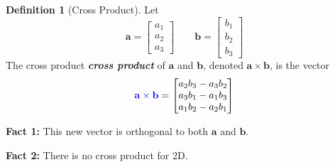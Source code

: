 \documentclass[10pt]{article}
\DeclareRobustCommand{\demph}[1]{%
  \ifmmode
  {\color{Blue}#1}%
  \else
  {\color{Blue}\bfseries\slshape #1}%
  \fi
}
\theoremstyle{definition}
\newtheorem{definition}[theorem]{Definition}
\newcommand{\fl}{\noindent\textbf} %
\newcommand{\1}[1]{\textbf{1}_{\left[#1\right]}} %
\begin{document}
\begin{definition}[Cross Product]
  \label{def:cross-product}
  Let
  \begin{equation*}
    \mathbf{a}=
    \begin{bmatrix}
      a_{1}\\a_{2}\\a_{3}
    \end{bmatrix}
    \qquad
    \mathbf{b}=
    \begin{bmatrix}
      b_{1}\\b_{2}\\b_{3}
    \end{bmatrix}
  \end{equation*}
  The \demph{cross product} of $\mathbf{a}$ and $\mathbf{b}$, denoted $\mathbf{a}\times \mathbf{b}$, is the vector
  \begin{equation*}
    \demph{\mathbf{a} \times \mathbf{b}} =
    \begin{bmatrix}
      a_{2}b_{3}-a_{3}b_{2}\\ a_{3}b_{1}-a_{1}b_{3}\\ a_{1}b_{2}-a_{2}b_{1}
    \end{bmatrix}
  \end{equation*}
\end{definition}
\fl{Fact 1:} This new vector is orthogonal to both $\mathbf{a}$ and $\mathbf{b}$.

\fl{Fact 2:} There is no cross product for 2D.
\end{document}
